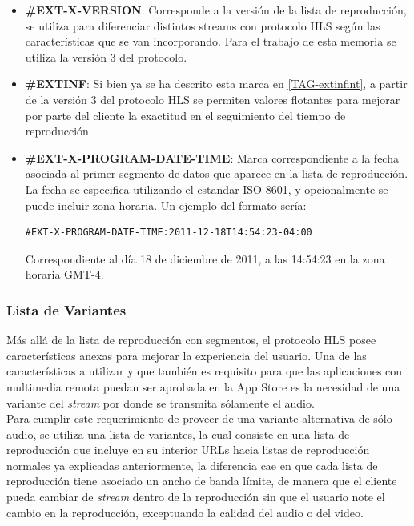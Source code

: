 \begin{itemize}
\item \textbf{\#EXT-X-VERSION}: Corresponde a la versión de la lista de reproducción, se utiliza para diferenciar distintos streams con protocolo HLS según las características que se van incorporando. Para el trabajo de esta memoria se utiliza la versión 3 del protocolo.

\item \textbf{\#EXTINF}: Si bien ya se ha descrito esta marca en \ref{TAG-extinfint}, a partir de la versión 3 del protocolo HLS se permiten valores flotantes para mejorar por parte del cliente la exactitud en el seguimiento del tiempo de reproducción. 

\item \textbf{\#EXT-X-PROGRAM-DATE-TIME}: Marca correspondiente a la fecha asociada al primer segmento de datos que aparece en la lista de reproducción. La fecha se especifica utilizando el estandar ISO 8601, y opcionalmente se puede incluir zona horaria. Un ejemplo del formato sería:

\begin{lstlisting}
#EXT-X-PROGRAM-DATE-TIME:2011-12-18T14:54:23-04:00
\end{lstlisting}

Correspondiente al día 18 de diciembre de 2011, a las 14:54:23 en la zona horaria GMT-4.

\end{itemize}
\subsubsection{Lista de Variantes}
Más allá de la lista de reproducción con segmentos, el protocolo HLS posee características anexas para mejorar la experiencia del usuario.
Una de las características a utilizar y que también es requisito para que las aplicaciones con multimedia remota puedan ser aprobada en la App Store es la necesidad de una variante del \textit{stream} por donde se transmita sólamente el audio.\\

Para cumplir este requerimiento de proveer de una variante alternativa de sólo audio, se utiliza una lista de variantes, la cual consiste en una lista de reproducción que incluye en su interior URLs hacia listas de reproducción normales ya explicadas anteriormente, la diferencia cae en que cada lista de reproducción tiene asociado un ancho de banda límite, de manera que el cliente pueda cambiar de \textit{stream} dentro de la reproducción sin que el usuario note el cambio en la reproducción, exceptuando la calidad del audio o del video.\\

